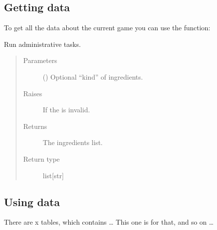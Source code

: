 \documentclass[letterpaper,10pt,english]{sphinxmanual}
\begin{document}
\subsection{Getting data}
\label{\detokenize{Usage:getting-data}}\label{\detokenize{Usage:id1}}
\sphinxAtStartPar
To get all the data about the current game
you can use the  function:

\begin{fulllineitems}
\label{\detokenize{Usage:manage.main}}
\pysigstartsignatures
{}
\pysigstopsignatures
\sphinxAtStartPar
Run administrative tasks.
\begin{quote}\begin{description}
\item[{Parameters}] \leavevmode
\sphinxAtStartPar
{} (\sphinxstyleliteralemphasis{\sphinxupquote{{[}}}\sphinxstyleliteralemphasis{\sphinxupquote{{]} or }}) \textendash{} Optional “kind” of ingredients.

\item[{Raises}] \leavevmode
\sphinxAtStartPar
{} \textendash{} If the  is invalid.

\item[{Returns}] \leavevmode
\sphinxAtStartPar
The ingredients list.

\item[{Return type}] \leavevmode
\sphinxAtStartPar
list{[}str{]}

\end{description}\end{quote}

\end{fulllineitems}



\subsection{Using data}
\label{\detokenize{Usage:using-data}}
\sphinxAtStartPar
There are x tables, which contains …
This one is for that, and so on …
\end{document}
